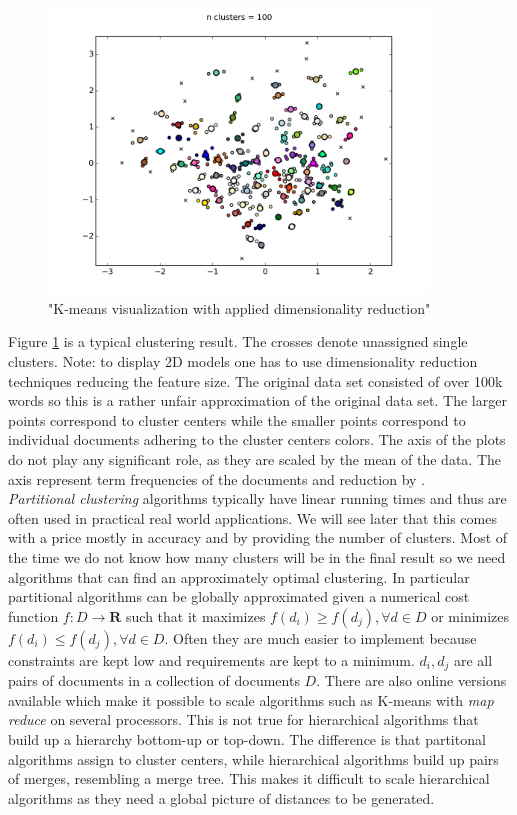     \begin{figure}[h!]
      \centering
        \includegraphics[width=0.9\textwidth]{kmeans_clustering.png}
        \caption{"K-means visualization with applied dimensionality reduction"}
        \label{kmeans_clustering}
    \end{figure}

    Figure \ref{kmeans_clustering} is a typical clustering result. The crosses denote unassigned single clusters. Note: to display 2D models one has to use dimensionality reduction techniques reducing the feature size. The original data set consisted of over 100k words so this is a rather unfair approximation of the original data set. The larger points correspond to cluster centers while the smaller points correspond to individual documents adhering to the cluster centers colors. The axis of the plots do not play any significant role, as they are scaled by the mean of the data. The axis represent term frequencies of the documents and reduction by \pca{}.\\

    \emph{Partitional clustering} algorithms typically have linear running times and thus are often used in practical real world applications. We will see later that this comes with a price mostly in accuracy and by providing the number of clusters. Most of the time we do not know how many clusters will be in the final result so we need algorithms that can find an approximately optimal clustering. In particular partitional algorithms can be globally approximated given a numerical cost function $f:D \to \mathbf{R}$ such that it maximizes $f(d_i) \geq f(d_j), \forall d \in D$  or minimizes $f(d_i) \leq f(d_j), \forall d \in D$. Often they are much easier to implement because constraints are kept low and requirements are kept to a minimum. $d_i,d_j$ are all pairs of documents in a collection of documents $D$. There are also online versions available which make it possible to scale algorithms such as K-means with \emph{map reduce} on several processors. This is not true for hierarchical algorithms that build up a hierarchy bottom-up or top-down. The difference is that partitonal algorithms assign to cluster centers, while hierarchical algorithms build up pairs of merges, resembling a merge tree. This makes it difficult to scale hierarchical algorithms as they need a global picture of distances to be generated.

